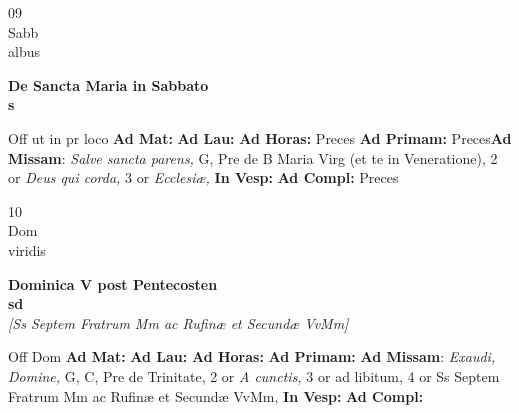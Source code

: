 \documentclass[10pt, openany]{book}
\begin{document}
    \begin{center}
        \begin{minipage}{3.5in}
            \vspace{2em}
            \begin{minipage}{0.5in}
                {\Huge 09} \\
                {\normalsize Sabb} \\
                {\normalsize albus}
            \end{minipage}
            \begin{minipage}{3.0in}
                \textbf{ \large De Sancta Maria in Sabbato \\
                \textnormal{\normalsize s}} \\ 
            \end{minipage}
            \begin{justify}Off ut in pr loco
                \textbf{Ad Mat: }
                \textbf{Ad Lau: }
                \textbf{Ad Horas: }Preces
                \textbf{Ad Primam: }Preces\textbf{Ad Missam}: \textit{Salve sancta parens,} G, Pre de B Maria Virg (et te in Veneratione), 2 or \textit{Deus qui corda,} 3 or \textit{Ecclesiæ,}  
                \textbf{In Vesp: }
                \textbf{Ad Compl: }Preces
            \end{justify}
        \end{minipage}
    \end{center}

    \begin{center}
        \begin{minipage}{3.5in}
            \vspace{2em}
            \begin{minipage}{0.5in}
                {\Huge 10} \\
                {\normalsize Dom} \\
                {\normalsize viridis}
            \end{minipage}
            \begin{minipage}{3.0in}
                \textbf{ \large Dominica V post Pentecosten \\
                \textnormal{\normalsize sd}} \\ \textit{[Ss Septem Fratrum Mm ac Rufinæ et Secundæ VvMm]} \\ 
            \end{minipage}
            \begin{justify}Off Dom
                \textbf{Ad Mat: }
                \textbf{Ad Lau: }
                \textbf{Ad Horas: }
                \textbf{Ad Primam: }\textbf{Ad Missam}: \textit{Exaudi, Domine,} G, C, Pre de Trinitate, 2 or \textit{A cunctis,} 3 or ad libitum, 4 or Ss Septem Fratrum Mm ac Rufinæ et Secundæ VvMm,  
                \textbf{In Vesp: }
                \textbf{Ad Compl: }
            \end{justify}
        \end{minipage}
    \end{center}
\end{document}
